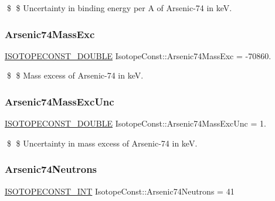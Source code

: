\$ \$ Uncertainty in binding energy per A of Arsenic-\/74 in keV. \mbox{\label{group___isotope_const-_arsenic-_as74_ga70828ec09ca27d695d7b2a006304c92f}} 
\subsubsection{\texorpdfstring{Arsenic74\+Mass\+Exc}{Arsenic74MassExc}}
{\footnotesize\ttfamily \mbox{\hyperlink{group___isotope_const-_macros_ga8f45a7272ce02c0b4c65c44636ed719a}{I\+S\+O\+T\+O\+P\+E\+C\+O\+N\+S\+T\+\_\+\+D\+O\+U\+B\+LE}} Isotope\+Const\+::\+Arsenic74\+Mass\+Exc = -\/70860.}

\$ \$ Mass excess of Arsenic-\/74 in keV. \mbox{\label{group___isotope_const-_arsenic-_as74_gaab7721850dfff9b148376f6ea194a00c}} 
\subsubsection{\texorpdfstring{Arsenic74\+Mass\+Exc\+Unc}{Arsenic74MassExcUnc}}
{\footnotesize\ttfamily \mbox{\hyperlink{group___isotope_const-_macros_ga8f45a7272ce02c0b4c65c44636ed719a}{I\+S\+O\+T\+O\+P\+E\+C\+O\+N\+S\+T\+\_\+\+D\+O\+U\+B\+LE}} Isotope\+Const\+::\+Arsenic74\+Mass\+Exc\+Unc = 1.}

\$ \$ Uncertainty in mass excess of Arsenic-\/74 in keV. \mbox{\label{group___isotope_const-_arsenic-_as74_gad68ef32e9d129dcb1756de0261d81947}} 
\subsubsection{\texorpdfstring{Arsenic74\+Neutrons}{Arsenic74Neutrons}}
{\footnotesize\ttfamily \mbox{\hyperlink{group___isotope_const-_macros_ga5f18360b3e99483a35c32d789e62621c}{I\+S\+O\+T\+O\+P\+E\+C\+O\+N\+S\+T\+\_\+\+I\+NT}} Isotope\+Const\+::\+Arsenic74\+Neutrons = 41}

